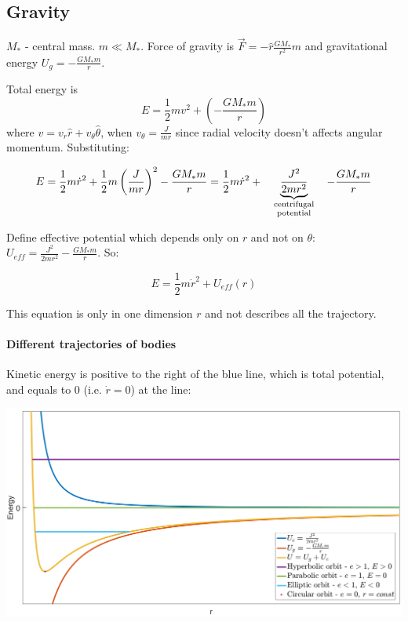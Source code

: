 \subsection{Gravity}
$M_*$ - central mass. $m \ll M_*$. Force of gravity is $\vec{F} = -\hat{r}\frac{GM_*}{r^2}m$ and gravitational energy $U_g = - \frac{GM_*m}{r}$.

Total energy is $$E = \frac{1}{2}mv^2+\left( -\frac{GM_*m}{r} \right)$$
where $v = v_r\hat{r}+v_\theta\hat{\theta}$, when $v_\theta = \frac{J}{mr}$ since radial velocity doesn't affects angular momentum. Substituting:

$$E=\frac{1}{2}m\dot{r}^2+\frac{1}{2}m\left( \frac{J}{mr}\right)^2 -\frac{GM_*m}{r} = \frac{1}{2}m\dot{r}^2+\underbrace{\frac{J^2}{2mr^2}}_{\parbox{2cm}{\centering \scriptsize centrifugal potential}} -\frac{GM_*m}{r}$$

Define effective potential which depends only on $r$ and not on $\theta$: $U_{eff} = \frac{J^2}{2mr^2} - \frac{GM_*m}{r}$. So:

$$E = \frac{1}{2}m\dot{r}^2 + U_{eff}(r)$$

This equation is only in one dimension $r$ and not describes all the trajectory.

\paragraph{Different trajectories of bodies} Kinetic energy is positive to the right of the blue line, which is total potential, and equals to 0 (i.e. $\dot{r}=0$) at the line:
\begin{center}
	\includegraphics[width=\linewidth]{./lect15/pic1.png}
\end{center}
\begin{center}	
	
\end{center}

